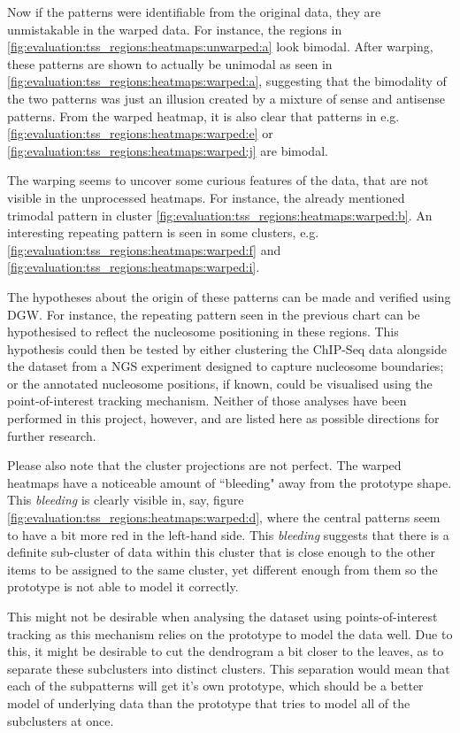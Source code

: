 \documentclass[parskip]{cs4rep}
\begin{document}
Now if the patterns were identifiable from the original data, they are unmistakable in the warped data. For instance, the regions in \autoref{fig:evaluation:tss_regions:heatmaps:unwarped:a} look bimodal. After warping, these patterns are shown to actually be unimodal as seen in \autoref{fig:evaluation:tss_regions:heatmaps:warped:a}, suggesting that the bimodality of the two patterns was just an illusion created by a mixture of sense and antisense patterns.
From the warped heatmap, it is also clear that patterns in e.g. \autoref{fig:evaluation:tss_regions:heatmaps:warped:e} or \autoref{fig:evaluation:tss_regions:heatmaps:warped:j} are bimodal.

The warping seems to uncover some curious features of the data, that are not visible in the unprocessed heatmaps. For instance, the already mentioned trimodal pattern in cluster \autoref{fig:evaluation:tss_regions:heatmaps:warped:b}.
An interesting repeating pattern is seen in some clusters, e.g. \autoref{fig:evaluation:tss_regions:heatmaps:warped:f} and \autoref{fig:evaluation:tss_regions:heatmaps:warped:i}.

The hypotheses about the origin of these patterns can be made and verified using DGW.
For instance, the repeating pattern seen in the previous chart can be hypothesised to reflect the nucleosome positioning in these regions. This hypothesis could then be tested by either clustering the ChIP-Seq data alongside the dataset from a NGS experiment designed to capture nucleosome boundaries;
or the annotated nucleosome positions, if known, could be visualised using the point-of-interest tracking mechanism. Neither of those analyses have been performed in this project, however, and are listed here as possible directions for further research.

Please also note that the cluster projections are not perfect. The warped heatmaps have a noticeable amount of ``bleeding" away from the prototype shape. 
This \emph{bleeding} is clearly visible in, say, figure \autoref{fig:evaluation:tss_regions:heatmaps:warped:d}, where the central patterns seem to have a bit more red in the left-hand side. This \emph{bleeding} suggests that there is a definite sub-cluster of data within this cluster that is close enough to the other items to be assigned to the same cluster, yet different enough from them so the prototype is not able to model it correctly. 

This might not be desirable when analysing the dataset using points-of-interest tracking as this mechanism relies on the prototype to model the data well. 
Due to this, it might be desirable to cut the dendrogram a bit closer to the leaves, as to separate these subclusters into distinct clusters. This separation would mean that each of the subpatterns will get it's own prototype, which should be a better model of underlying data than the prototype that tries to model all of the subclusters at once. 
\end{document}

